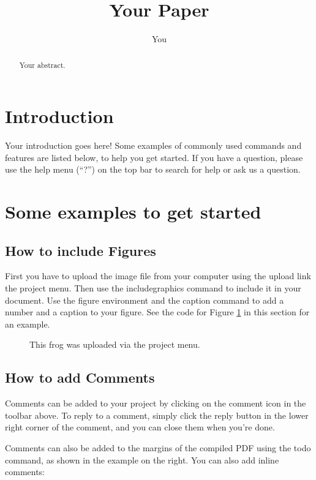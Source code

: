 \documentclass[a4paper]{article}
\title{Your Paper}
\author{You}
\begin{document}
\maketitle

\begin{abstract}
Your abstract.
\end{abstract}

\section{Introduction}

Your introduction goes here! Some examples of commonly used commands and features are listed below, to help you get started. If you have a question, please use the help menu (``?'') on the top bar to search for help or ask us a question. 

\section{Some examples to get started}

\subsection{How to include Figures}

First you have to upload the image file from your computer using the upload link the project menu. Then use the includegraphics command to include it in your document. Use the figure environment and the caption command to add a number and a caption to your figure. See the code for Figure \ref{fig:frog} in this section for an example.

\begin{figure}
\centering
\caption{\label{fig:frog}This frog was uploaded via the project menu.}
\end{figure}

\subsection{How to add Comments}

Comments can be added to your project by clicking on the comment icon in the toolbar above. %
%
%
To reply to a comment, simply click the reply button in the lower right corner of the comment, and you can close them when you're done.

Comments can also be added to the margins of the compiled PDF using the todo command,  as shown in the example on the right. You can also add inline comments:
\end{document}
